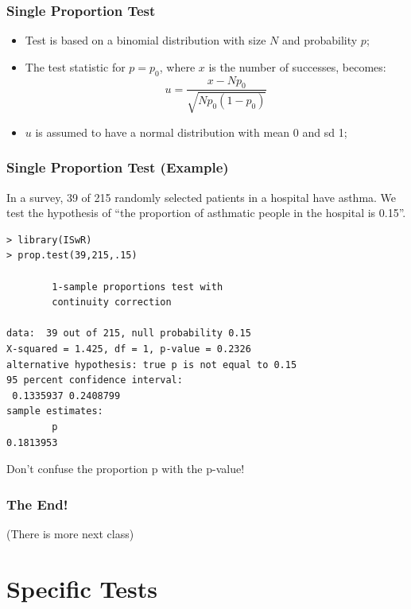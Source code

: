 \documentclass[10pt]{beamer}
\begin{document}
\begin{frame}
  \frametitle{Single Proportion Test}
  \begin{itemize}
  \item Test is based on a binomial distribution with size $N$ and
    probability $p$;
  \item The test statistic for $p = p_0$, where $x$ is the number of
    successes, becomes:
    \begin{equation*}
      u = \frac{x - Np_0}{\sqrt{Np_0(1-p_0)}}
    \end{equation*}
  \item $u$ is assumed to have a normal distribution with mean 0 and sd 1;
  \end{itemize}
\end{frame}

\begin{frame}
  \frametitle{Single Proportion Test (Example)} {\small In a survey,
    39 of 215 randomly selected patients in a hospital have asthma. We
    test the hypothesis of ``the proportion of asthmatic people in the
    hospital is 0.15''.
  \begin{block}{}
\begin{verbatim}
> library(ISwR)
> prop.test(39,215,.15)

        1-sample proportions test with 
        continuity correction

data:  39 out of 215, null probability 0.15 
X-squared = 1.425, df = 1, p-value = 0.2326
alternative hypothesis: true p is not equal to 0.15 
95 percent confidence interval:
 0.1335937 0.2408799 
sample estimates:
        p 
0.1813953
\end{verbatim}
  \end{block}
  \alert{Don't confuse the proportion p with the p-value!}
  }
\end{frame}

\begin{frame}
  \frametitle{The End!}

  (There is more next class)
\end{frame}




\section{Specific Tests}
\end{document}
